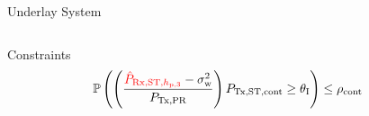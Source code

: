 \documentclass[16pt]{beamer}
\begin{document}
\begin{frame}[t]{Underlay System}
\begin{columns}
\begin{column}{0.62\columnwidth}
\begin{center}
\begin{overlayarea}{\textwidth}{4.65cm}
{{				}
			}
			\end{overlayarea}
			\end{center}
			{
				\begin{block}{\footnotesize Constraints}
				\vspace{-2.mm}	
					\begin{align*}		
						\p\left( \left( \frac{{\color{red}{\eprcvdstpr}} - \nps}{\ptran}\right) \preg \ge \ite \right) &\le \opc %
                                \end{align*} 
               		 	\end{block}
			} 
		\end{column}
	\end{columns}
\end{frame}
\end{document}
